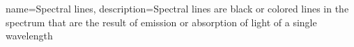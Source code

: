 {
    name=Spectral lines,
    description={Spectral lines are black or colored lines in the spectrum that are the result of emission or absorption of light of a single wavelength}
}
